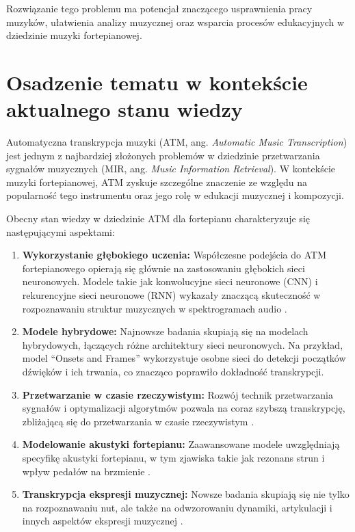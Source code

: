 \documentclass[a4paper,twoside,12pt]{book}
\begin{document}
Rozwiązanie tego problemu ma potencjał znaczącego usprawnienia pracy muzyków, ułatwienia analizy muzycznej oraz wsparcia procesów edukacyjnych w dziedzinie muzyki fortepianowej.

\section{Osadzenie tematu w kontekście aktualnego stanu wiedzy}

Automatyczna transkrypcja muzyki (ATM, ang. \textit{Automatic Music Transcription}) jest jednym z najbardziej złożonych problemów w dziedzinie przetwarzania sygnałów muzycznych (MIR, ang. \textit{Music Information Retrieval}). W kontekście muzyki fortepianowej, ATM zyskuje szczególne znaczenie ze względu na popularność tego instrumentu oraz jego rolę w edukacji muzycznej i kompozycji.

Obecny stan wiedzy w dziedzinie ATM dla fortepianu charakteryzuje się następującymi aspektami:

\begin{enumerate}
	\item \textbf{Wykorzystanie głębokiego uczenia:} Współczesne podejścia do ATM fortepianowego opierają się głównie na zastosowaniu głębokich sieci neuronowych. Modele takie jak konwolucyjne sieci neuronowe (CNN) i rekurencyjne sieci neuronowe (RNN) wykazały znaczącą skuteczność w rozpoznawaniu struktur muzycznych w spektrogramach audio \cite{bib:hawthorne2018onsets}.
	          
	\item \textbf{Modele hybrydowe:} Najnowsze badania skupiają się na modelach hybrydowych, łączących różne architektury sieci neuronowych. Na przykład, model ``Onsets and Frames'' \cite{bib:hawthorne2018onsets} wykorzystuje osobne sieci do detekcji początków dźwięków i ich trwania, co znacząco poprawiło dokładność transkrypcji.
	          
	\item \textbf{Przetwarzanie w czasie rzeczywistym:} Rozwój technik przetwarzania sygnałów i optymalizacji algorytmów pozwala na coraz szybszą transkrypcję, zbliżającą się do przetwarzania w czasie rzeczywistym \cite{bib:kelz2016potential}.
	          
	\item \textbf{Modelowanie akustyki fortepianu:} Zaawansowane modele uwzględniają specyfikę akustyki fortepianu, w tym zjawiska takie jak rezonans strun i wpływ pedałów na brzmienie \cite{bib:cheng2016attack}.
	          
	\item \textbf{Transkrypcja ekspresji muzycznej:} Nowsze badania skupiają się nie tylko na rozpoznawaniu nut, ale także na odwzorowaniu dynamiki, artykulacji i innych aspektów ekspresji muzycznej \cite{bib:jeong2017deep}.
\end{enumerate}
\end{document}
